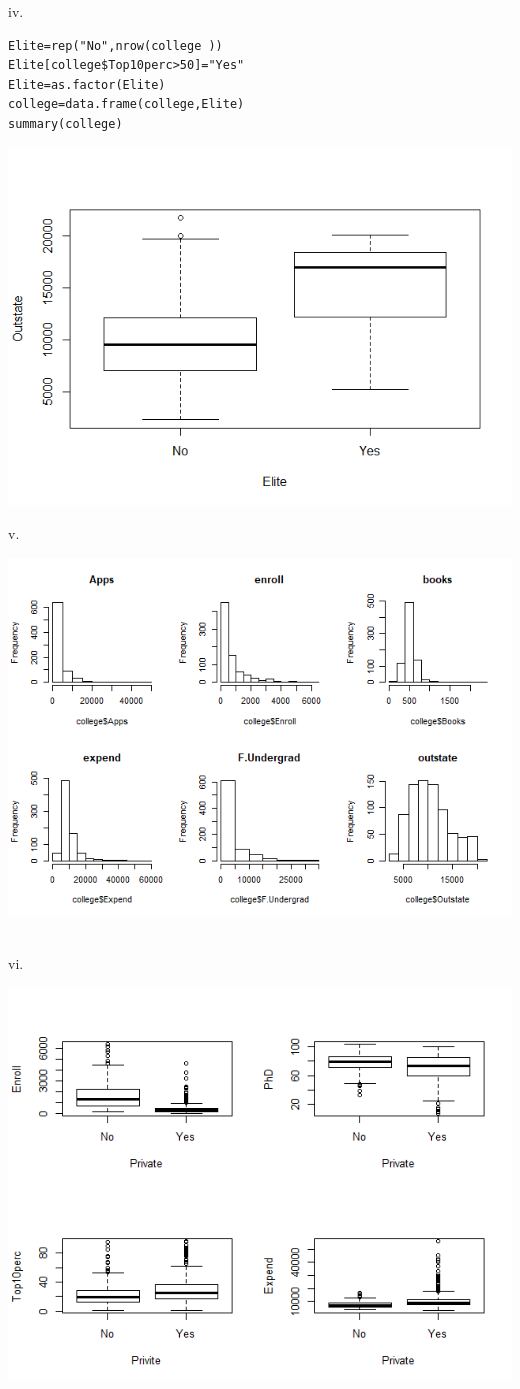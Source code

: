 \documentclass[12pt]{article}
\begin{document}
\begin{itemize}
iv.\begin{verbatim}
Elite=rep("No",nrow(college ))
Elite[college$Top10perc>50]="Yes"
Elite=as.factor(Elite)
college=data.frame(college,Elite)
summary(college)
\end{verbatim}
\centerline{\includegraphics[width=0.8\linewidth]{box2}}
v.\\
\centerline{\includegraphics[width=0.9\linewidth]{hist}}\\[2ex]
vi.\\
\centerline{\includegraphics[width=1.0\linewidth]{explore}}\\[2ex]

\end{itemize}
\end{document}

